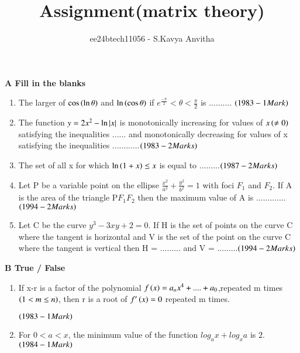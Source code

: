 \documentclass[journal,12pt,twocolumn]{IEEEtran}
\theoremstyle{remark}
\begin{document}

\vspace{3cm}

\title{Assignment(matrix theory)}
\author{ee24btech11056 - S.Kavya Anvitha}
\maketitle
\textbf{A Fill in the blanks}\\
\begin{enumerate}
	\item The larger of $\cos \left(\ln \theta\right)$ and 
$\ln \left(\cos \theta\right)$ if $e^{\frac{-\pi}{2}}< \theta< \frac{\pi}{2}$
is ..........
		\hfill$\left(1983 - 1 Mark\right)$\\

        \item The function $y=2x^{2}-\ln \left\vert x\right\vert$ is monotonically 
increasing for values of $x\left(\neq0\right)$ satisfying the inequalities 
...... and monotonically decreasing for values of x satisfying the 
inequalities  ............\hfill$\left(1983 - 2 Marks\right)$\\

         \item The set of all x for which $\ln \left(1+x\right) \leq x$ is equal 
to .........\hfill$\left(1987 - 2 Marks\right)$\\

         \item Let P be a variable point on the ellipse
$\displaystyle\frac{x^2}{a^2}+\displaystyle\frac{y^2}{b^2} = 1$ 
with foci $F_1$ and $F_2$. If A is the area of the triangle P$F_1$$F_2$ then
the maximum value of A is ............. \hfill$\left(1994 - 2 Marks\right)$\\

         \item Let C be the curve $y^3 - 3xy + 2 = 0.$ If H is the set of
points on the curve C where the tangent is horizontal and V is
the set of the point on the curve C where the tangent is vertical
then H = ......... and V = .........\hfill$\left(1994 - 2 Marks\right)$\\
\end{enumerate}

\textbf{B True / False}\\

\begin{enumerate}

	\item If x-r is a factor of the polynomial
$f\left(x\right) = a_nx^4+....+a_0$,repeated m times $\left(1< m\leq n\right)$, 
then r is a root of $f'\left(x\right)=0$ repeated m times.

\hfill$\left(1983 - 1 Mark\right)$\\

         \item For $0 < a < x$, the minimum value of the function 
$log_a x + log_x a$ is $2$. \hfill$\left(1984 - 1 Mark\right)$\\

\end{enumerate}
\end{document}
